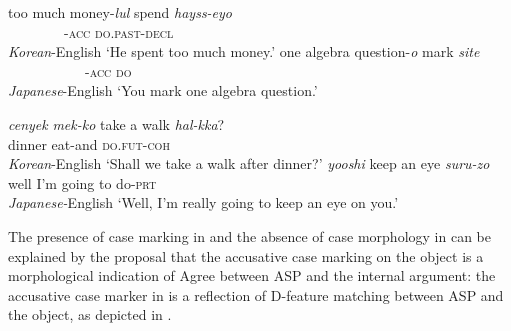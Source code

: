 \begin{exe}
\ex\label{ex:144}
\begin{xlist}
    \ex \gll too much money-\textit{lul}   spend \textit{hayss-eyo}      \\
    {} {} {~~~~~~~~}-\textsc{acc} {} \textsc{do}.\textsc{past}-\textsc{decl} \\
    \hspace*{\fill} \textit{Korean}-English
    \glt ‘He spent too much money.’
    \ex  \gll one algebra question-\textit{o}     mark \textit{site}      \\
     {} {} {~~~~~~~~~~~}-\textsc{acc} {} \textsc{do} \\
     \hspace*{\fill} \textit{Japanese}-English
    \glt   ‘You mark one algebra question.’
\end{xlist}
\ex\label{ex:145}
\begin{xlist}
     \ex \gll \textit{cenyek} \textit{mek-ko} take a walk   \textit{hal-kka}?   \\
    dinner eat-and {} {} {} \textsc{do}\textsc{.fut-coh} \\
    \hspace*{\fill} \textit{Korean}-English  
    \glt ‘Shall we take a walk after dinner?’
    \ex \gll \textit{yooshi}  keep an eye   \textit{suru-zo} \\
    {well I’m going to} {} {} {}  do-\textsc{prt}    \\
    \hspace*{\fill} \textit{Japanese-}English 
    \glt  ‘Well, I’m really going to keep an eye on you.’
\end{xlist}
\end{exe}

\largerpage[-1]
The presence of case marking in  and the absence of case morphology in  can be explained by the proposal that the accusative case marking on the object is a morphological indication of Agree between \ac{ASP} and the internal argument: the accusative case marker in  is a reflection of D-feature matching between \ac{ASP} and the object, as depicted in .

